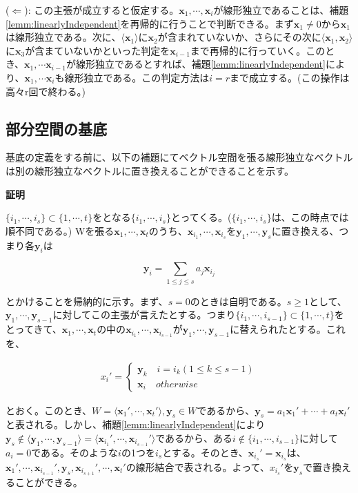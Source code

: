 \documentclass[dvipdfmx,autodetect-engine]{jsarticle}
\begin{document}
($\Leftarrow$): この主張が成立すると仮定する。$\bm{x}_1, \cdots, \bm{x}_i$が線形独立であることは、補題\ref{lemm:linearlyIndependent}を再帰的に行うことで判断できる。まず$\bm{x}_1 \neq 0$から$\bm{x}_1$は線形独立である。次に、$\langle \bm{x}_1 \rangle$に$\bm{x}_2$が含まれていないか、さらにその次に$\langle \bm{x}_1, \bm{x}_2 \rangle$に$\bm{x}_3$が含まていないかといった判定を$\bm{x}_{i-1}$まで再帰的に行っていく。このとき、$\bm{x}_1, \cdots \bm{x}_{i-1}$が線形独立であるとすれば、補題\ref{lemm:linearlyIndependent}により、$\bm{x}_1, \cdots \bm{x}_i$も線形独立である。この判定方法は$i = r$まで成立する。(この操作は高々r回で終わる。)

\subsection{部分空間の基底}

基底の定義をする前に、以下の補題にてベクトル空間を張る線形独立なベクトルは別の線形独立なベクトルに置き換えることができることを示す。

\label{lemm:basisReplacing}

{\bf 証明}

$\{i_1, \cdots, i_{s}\} \subset \{1, \cdots, t\}$をとなる$\{i_1, \cdots, i_{s}\}$とってくる。($\{i_1, \cdots, i_s\}$は、この時点では順不同である。) Wを張る$\bm{x}_1, \cdots, \bm{x}_t$のうち、$\bm{x}_{i_1}, \cdots, \bm{x}_{i_s}$を$\bm{y}_1, \cdots, \bm{y}_s$に置き換える、つまり各$\bm{y}_i$は

$$
\bm{y}_i = \sum_{1 \leq j \leq s} a_j\bm{x}_{i_j}
$$

とかけることを帰納的に示す。まず、$s = 0$のときは自明である。$s \geq 1$として、$\bm{y}_1, \cdots, \bm{y}_{s-1}$に対してこの主張が言えたとする。つまり$\{i_1, \cdots, i_{s-1}\} \subset \{1, \cdots, t\}$をとってきて、$\bm{x}_1, \cdots, \bm{x}_t$の中の$\bm{x}_{i_1}, \cdots, \bm{x}_{i_{s-1}}$が$\bm{y}_1, \cdots, \bm{y}_{s-1}$に替えられたとする。これを、

\begin{eqnarray*}
  x_i' = \left\{
    \begin{array}{l}
      \bm{y}_k \quad i = i_k (1 \leq k \leq s -1) \\
      \bm{x}_i \quad otherwise
    \end{array}
  \right.
\end{eqnarray*}

とおく。このとき、$W = \langle \bm{x}_1', \cdots, \bm{x}_t' \rangle, \bm{y}_s \in W$であるから、$\bm{y}_s = a_1\bm{x}_1' + \cdots + a_t\bm{x}_t'$と表される。しかし、補題\ref{lemm:linearlyIndependent}により$\bm{y}_s \notin \langle \bm{y}_1, \cdots, \bm{y}_{s-1} \rangle = \langle \bm{x}_{i_1}', \cdots, \bm{x}_{i_{s-1}}' \rangle$であるから、ある$i \notin \{i_1, \cdots, i_{s-1} \}$に対して$a_i = 0$である。そのような$i$の1つを$i_s$とする。そのとき、$\bm{x}_{i_s}' = \bm{x}_{i_s}$は、$\bm{x}_1', \cdots, \bm{x}_{i_{s-1}}', \bm{y}_s, \bm{x}_{i_{s + 1}}', \cdots, \bm{x}_t'$の線形結合で表される。よって、$x_{i_s}'$を$\bm{y}_s$で置き換えることができる。
\end{document}

